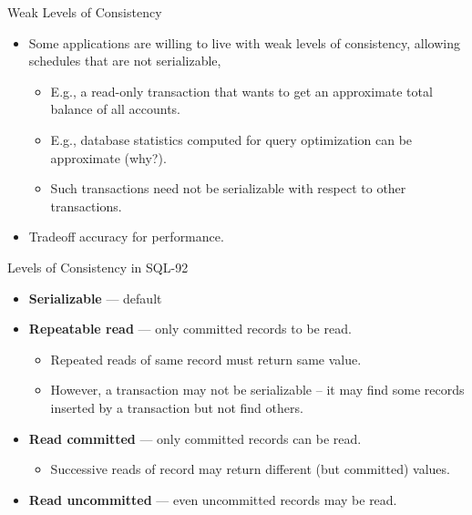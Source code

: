 \documentclass{beamer}
\begin{document}
\begin{frame}{Weak Levels of Consistency}

    \begin{itemize}
        \item Some applications are willing to live with weak levels of consistency, allowing schedules that are not serializable,
            \begin{itemize}
                \item E.g., a read-only transaction that wants to get an approximate total balance of all accounts.
                \item E.g., database statistics computed for query optimization can be approximate (why?).
                \item Such transactions need not be serializable with respect to other transactions.
            \end{itemize}
        \item Tradeoff accuracy for performance.
    \end{itemize}

\end{frame}

\begin{frame}{Levels of Consistency in SQL-92}

    \begin{itemize}
        \item \textbf{Serializable} — default
        \item \textbf{Repeatable read} — only committed records to be read.
            \begin{itemize}
                \item Repeated reads of same record must return same value.
                \item However, a transaction may not be serializable – it may find some records inserted by a transaction but not find others.
            \end{itemize}
        \item \textbf{Read committed} — only committed records can be read.
            \begin{itemize}
                \item Successive reads of record may return different (but committed) values.
            \end{itemize}
        \item \textbf{Read uncommitted} — even uncommitted records may be read.
    \end{itemize}

\end{frame}
\end{document}
